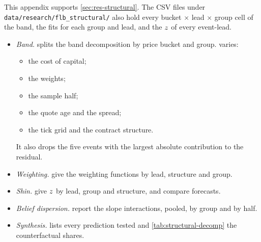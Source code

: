 
This appendix supports \cref{sec:res-structural}. The CSV files under \texttt{data/research/flb\_structural/} also
hold every bucket $\times$ lead $\times$ group cell of the band, the fits for each group and lead, and the $z$ of
every event-lead.
\begin{itemize}
  \item \emph{Band.}  splits the band decomposition by price bucket and group.
   varies:
  \begin{itemize}
    \item the cost of capital;
    \item the weights;
    \item the sample half;
    \item the quote age and the spread;
    \item the tick grid and the contract structure.
  \end{itemize}
  It also drops the five events with the largest absolute contribution to the residual.
  \item \emph{Weighting.}  give the weighting
  functions by lead, structure and group.
  \item \emph{Shin.}  give
  $z$ by lead, group and structure, and compare forecasts.
  \item \emph{Belief dispersion.} 
  report the slope interactions, pooled, by group and by half.
  \item \emph{Synthesis.}  lists every prediction tested and
  \cref{tab:structural-decomp} the counterfactual shares.
\end{itemize}

